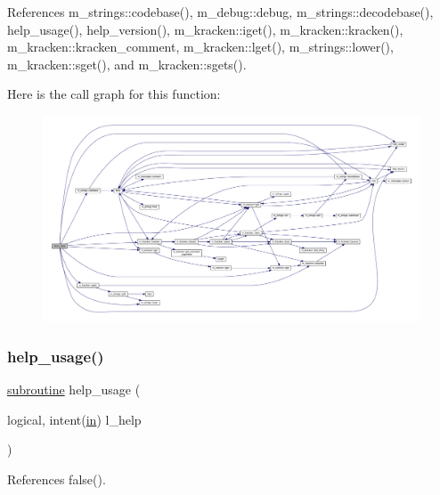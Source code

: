 References m\+\_\+strings\+::codebase(), m\+\_\+debug\+::debug, m\+\_\+strings\+::decodebase(), help\+\_\+usage(), help\+\_\+version(), m\+\_\+kracken\+::iget(), m\+\_\+kracken\+::kracken(), m\+\_\+kracken\+::kracken\+\_\+comment, m\+\_\+kracken\+::lget(), m\+\_\+strings\+::lower(), m\+\_\+kracken\+::sget(), and m\+\_\+kracken\+::sgets().

Here is the call graph for this function\+:
\nopagebreak
\begin{figure}[H]
\begin{center}
\leavevmode
\includegraphics[width=350pt]{base_8f90_aeacab8d1e6bcb1553d1ff3d04b88f44c_cgraph}
\end{center}
\end{figure}
\mbox{\label{base_8f90_a3e09a3b52ee8fb04eeb93fe5761626a8}} 
\subsubsection{\texorpdfstring{help\+\_\+usage()}{help\_usage()}}
{\footnotesize\ttfamily \hyperlink{M__stopwatch_83_8txt_acfbcff50169d691ff02d4a123ed70482}{subroutine} help\+\_\+usage (\begin{DoxyParamCaption}\item[{logical, intent(\hyperlink{M__journal_83_8txt_afce72651d1eed785a2132bee863b2f38}{in})}]{l\+\_\+help }\end{DoxyParamCaption})}



References false().

